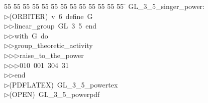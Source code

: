%
%
\begin{tabbing}
55 \= 55 \= 55 \= 55 \= 55 \= 55 \= 55 \= 55 \= 55 \= 55 \= 55 \= 55 \= 55 \= \kill
GL\_3\_5\_singer\_power:\\[0pt]
$\triangleright$\>(ORBITER)\ v\ 6\ define\ G\ \\[0pt]
$\triangleright$\>$\triangleright$\>linear\_group\ GL\ 3\ 5\ end\ \\[0pt]
$\triangleright$\>$\triangleright$\>with\ G\ do\ \\[0pt]
$\triangleright$\>$\triangleright$\>group\_theoretic\_activity\ \\[0pt]
$\triangleright$\>$\triangleright$\>$\triangleright$\>raise\_to\_the\_power\ \\[0pt]
$\triangleright$\>$\triangleright$\>$\triangleright$\>010\ 001\ 304\ 31\ \\[0pt]
$\triangleright$\>$\triangleright$\>end\\[0pt]
$\triangleright$\>(PDFLATEX)\ GL\_3\_5\_powertex\\[0pt]
$\triangleright$\>(OPEN)\ GL\_3\_5\_powerpdf\\[0pt]
\end{tabbing}
